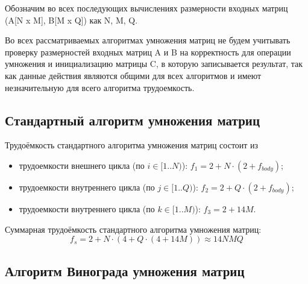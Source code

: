 Обозначим во всех последующих вычислениях размерности входных матриц (A[N x M], B[M x Q]) как N, M, Q.

Во всех рассматриваемых алгоритмах умножения матриц не будем учитывать проверку размерностей входных матриц A и B на корректность для операции умножения и инициализацию матрицы C, в которую записывается результат, так как данные действия являются общими для всех алгоритмов и имеют незначительную для всего алгоритма трудоемкость.

\subsection{Стандартный алгоритм умножения матриц}

Трудоёмкость стандартного алгоритма умножения матриц состоит из
\begin{itemize}
	\item трудоемкости внешнего цикла (по $i \in [1..N)$): $f_1 = 2 + N \cdot (2 + f_{body})$;
	\item трудоемкости внутреннего цикла (по $j \in [1..Q)$): $f_2 = 2 + Q \cdot (2 + f_{body})$;
	\item трудоемкости внутреннего цикла (по $k \in [1..M)$): $f_3  = 2 + 14M$.
\end{itemize}

Суммарная трудоёмкость стандартного алгоритма умножения матриц:
\begin{equation}
	\label{for:standard}
	f_{s} = 2 + N \cdot (4 + Q \cdot (4 + 14M)) \approx 14NMQ
\end{equation}

\subsection{Алгоритм Винограда умножения матриц}

